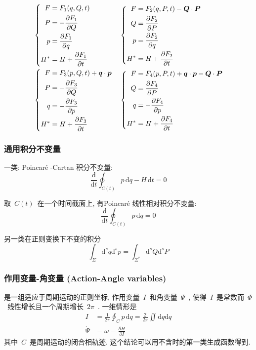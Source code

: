 \documentclass[11pt,a4paper]{article}%
\newcommand{\dif}{\mathrm{d}}
\newcommand{\diff}{\,\mathrm{d}}
\renewcommand{\[}{~$\displaystyle}
\renewcommand{\]}{$~}%
\begin{document}
\begin{enumerate}
\begin{align*}
    &\left\{\begin{aligned}F &=F_1(q,Q,t)\\P &= - \frac{\partial F_1}{\partial Q} \\ p &= \frac{\partial F_1}{\partial q}\\ H^* &= H + \frac{\partial F_1}{\partial t}\end{aligned}\right.&
    &\left\{\begin{aligned}F &=F_2(q,P,t) -\bm Q \cdot\bm P \\Q &= \frac{\partial F_2}{\partial P} \\ p &= \frac{\partial F_2}{\partial q}\\ H^* &= H + \frac{\partial F_2}{\partial t}\end{aligned}\right.\\
    &\left\{\begin{aligned}F &=F_3(p,Q,t) + \bm q \cdot \bm p  \\ P &= -\frac{\partial F_3}{\partial Q}\\q &= - \frac{\partial F_3}{\partial p}\\ H^* &= H + \frac{\partial F_3}{\partial t}\end{aligned}\right.&
    &\left\{\begin{aligned}F &=F_4(p,P,t)+ \bm q \cdot \bm p  -\bm Q \cdot\bm P \\Q &=  \frac{\partial F_4}{\partial P} \\ q &= -\frac{\partial F_4}{\partial p}\\ H^* &= H + \frac{\partial F_4}{\partial t}\end{aligned}\right.
    \end{align*}

  \end{enumerate}
  \subsubsection{通用积分不变量}
  一类: Poincar\'e -Cartan 积分不变量: 
  $$\frac{\dif }{\dif t}\oint_{C(t)}p\diff q - H\diff t = 0$$
  
  取\[C(t)\]在一个时间截面上, 有Poincar\'e 线性相对积分不变量: 
  $$\frac{\dif }{\dif t}\oint_{C(t)}p\diff q = 0$$
  
  另一类在正则变换下不变的积分
  $$\int_{\Sigma}\dif^s q\dif^s p = \int_{\Sigma^*} \dif^s Q\dif^s P$$
  
  \subsubsection{作用变量-角变量 (Action-Angle variables)}
  是一组适应于周期运动的正则坐标, 作用变量\[I\]和角变量\[\Psi\], 使得\[I\]是常数而\[\Phi\]线性增长且一个周期增长\[2\pi\]. 一维情形是
  \begin{align*}
   I &= \frac{1}{2\pi}\oint_{C}p\diff q = \frac{2}{2\pi}\iint\dif q\dif q \\
   \dot \Psi &= \omega = \frac{\partial H}{\partial I}
  \end{align*}
  其中\[C\]是周期运动的闭合相轨迹. 这个结论可以用不含时的第一类生成函数得到.
  
\end{document}
